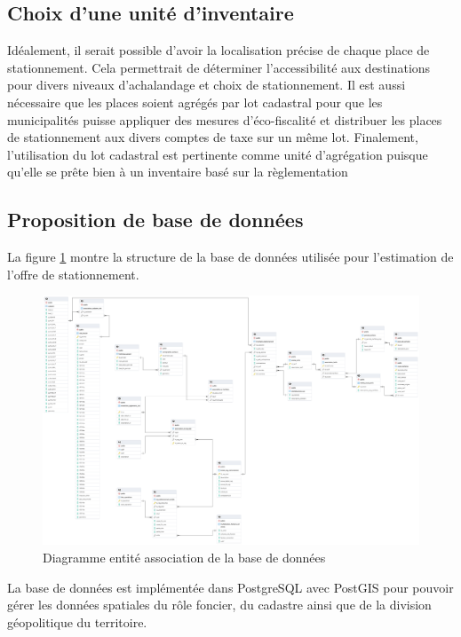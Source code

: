     \subsection{Choix d'une unité d'inventaire}
    Idéalement, il serait possible d'avoir la localisation précise de chaque place de stationnement. Cela permettrait de déterminer l'accessibilité aux destinations pour divers niveaux d'achalandage et choix de stationnement. Il est aussi nécessaire que les places soient agrégés par lot cadastral pour que les municipalités puisse appliquer des mesures d'éco-fiscalité et distribuer les places de stationnement aux divers comptes de taxe sur un même lot. Finalement, l'utilisation du lot cadastral est pertinente comme unité d'agrégation puisque qu'elle se prête bien à un inventaire basé sur la règlementation
    \subsection{Proposition de base de données}
    La figure \ref{fig:offstreet_db_erd} montre la structure de la base de données utilisée pour l'estimation de l'offre de stationnement. 
    \begin{landscape}
    \begin{figure}
        \centering
        \includegraphics[width = 0.85\linewidth]{images/structure_base_de_donnee.png}
        \caption{Diagramme entité association de la base de données}\label{fig:offstreet_db_erd}
    \end{figure}
    \end{landscape}
    La base de données est implémentée dans PostgreSQL avec PostGIS pour pouvoir gérer les données spatiales du rôle foncier, du cadastre ainsi que de la division géopolitique du territoire.\par
    
